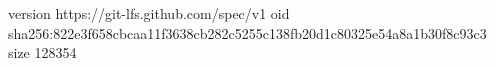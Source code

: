 version https://git-lfs.github.com/spec/v1
oid sha256:822e3f658cbcaa11f3638cb282c5255c138fb20d1c80325e54a8a1b30f8c93c3
size 128354
